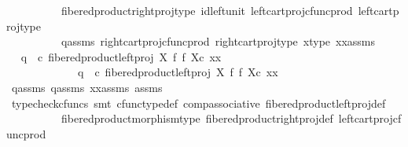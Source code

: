 \begin{isabellebody}
\ \ \ \ \ \ \ \ \ \ fibered{\isacharunderscore}{\kern0pt}product{\isacharunderscore}{\kern0pt}right{\isacharunderscore}{\kern0pt}proj{\isacharunderscore}{\kern0pt}type\ id{\isacharunderscore}{\kern0pt}left{\isacharunderscore}{\kern0pt}unit{}\ left{\isacharunderscore}{\kern0pt}cart{\isacharunderscore}{\kern0pt}proj{\isacharunderscore}{\kern0pt}cfunc{\isacharunderscore}{\kern0pt}prod\ left{\isacharunderscore}{\kern0pt}cart{\isacharunderscore}{\kern0pt}proj{\isacharunderscore}{\kern0pt}type\isanewline
\ \ \ \ \ \ \ \ \ \ q{}{\isacharunderscore}{\kern0pt}assms\ right{\isacharunderscore}{\kern0pt}cart{\isacharunderscore}{\kern0pt}proj{\isacharunderscore}{\kern0pt}cfunc{\isacharunderscore}{\kern0pt}prod\ right{\isacharunderscore}{\kern0pt}cart{\isacharunderscore}{\kern0pt}proj{\isacharunderscore}{\kern0pt}type\ x{\isacharunderscore}{\kern0pt}type\ xx{\isacharunderscore}{\kern0pt}assms{\isacharparenright}{\kern0pt}\isanewline
\ \ \ \ \isamarkupfalse%
\ \isamarkupfalse%
\ {\isachardoublequoteopen}q{}\ \ {\isasymcirc}\isactrlsub c\ {\isacharparenleft}{\kern0pt}{\isacharparenleft}{\kern0pt}fibered{\isacharunderscore}{\kern0pt}product{\isacharunderscore}{\kern0pt}left{\isacharunderscore}{\kern0pt}proj\ X\ f\ f\ X{\isacharparenright}{\kern0pt}{\isasymcirc}\isactrlsub c\ xx{\isacharparenright}{\kern0pt}\ {\isacharequal}{\kern0pt}\ \isanewline
\ \ \ \ \ \ \ \ \ \ \ \ \ q{}\ \ {\isasymcirc}\isactrlsub c\ {\isacharparenleft}{\kern0pt}{\isacharparenleft}{\kern0pt}fibered{\isacharunderscore}{\kern0pt}product{\isacharunderscore}{\kern0pt}left{\isacharunderscore}{\kern0pt}proj\ X\ f\ f\ X{\isacharparenright}{\kern0pt}{\isasymcirc}\isactrlsub c\ xx{\isacharparenright}{\kern0pt}{\isachardoublequoteclose}\isanewline
\ \ \ \ \ \ \isamarkupfalse%
\ q{}{\isacharunderscore}{\kern0pt}assms\ q{}{\isacharunderscore}{\kern0pt}assms\ xx{\isacharunderscore}{\kern0pt}assms\ assms\ \isanewline
\ \ \ \ \ \ \isamarkupfalse%
\ {\isacharparenleft}{\kern0pt}typecheck{\isacharunderscore}{\kern0pt}cfuncs{\isacharcomma}{\kern0pt}\ smt\ cfunc{\isacharunderscore}{\kern0pt}type{\isacharunderscore}{\kern0pt}def\ comp{\isacharunderscore}{\kern0pt}associative{}\ fibered{\isacharunderscore}{\kern0pt}product{\isacharunderscore}{\kern0pt}left{\isacharunderscore}{\kern0pt}proj{\isacharunderscore}{\kern0pt}def\isanewline
\ \ \ \ \ \ \ \ \ \ fibered{\isacharunderscore}{\kern0pt}product{\isacharunderscore}{\kern0pt}morphism{\isacharunderscore}{\kern0pt}type\ fibered{\isacharunderscore}{\kern0pt}product{\isacharunderscore}{\kern0pt}right{\isacharunderscore}{\kern0pt}proj{\isacharunderscore}{\kern0pt}def\ left{\isacharunderscore}{\kern0pt}cart{\isacharunderscore}{\kern0pt}proj{\isacharunderscore}{\kern0pt}cfunc{\isacharunderscore}{\kern0pt}prod\isanewline

\end{isabellebody}
